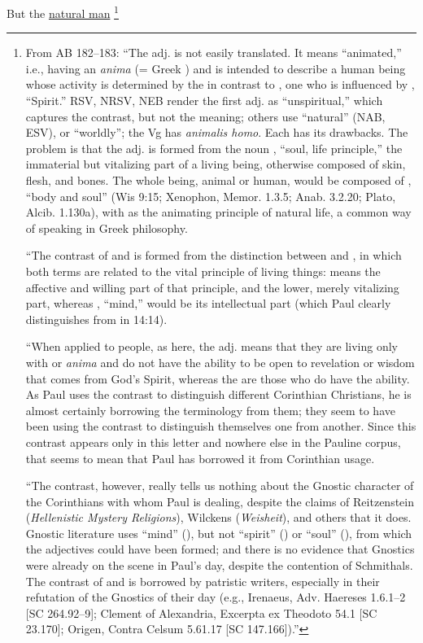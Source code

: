 			But the \hyperref[NATURAL-PHRASES]{natural man}%
				\footnote{%
					\label{1CORINTHIANS-2-14-natural}%
					From AB 182--183: ``The adj. \hyperref[PSUCHIKOS]{} is not easily translated. It means ``animated,'' i.e., having an \textit{anima} (= Greek ) and is intended to describe a human being whose activity is determined by the  in contrast to , one who is influenced by , ``Spirit.'' RSV, NRSV, NEB render the first adj. as ``unspiritual,'' which captures the contrast, but not the meaning; others use ``natural'' (NAB, ESV), or ``worldly''; the Vg has \textit{animalis homo}. Each has its drawbacks. The problem is that the adj. is formed from the noun , ``soul, life principle,'' the immaterial but vitalizing part of a living being, otherwise composed of skin, flesh, and bones. The whole being, animal or human, would be composed of , ``body and soul'' (Wis 9:15; Xenophon, Memor. 1.3.5; Anab. 3.2.20; Plato, Alcib. 1.130a), with  as the animating principle of natural life, a common way of speaking in Greek philosophy. 

					``The contrast of  and  is formed from the distinction between  and , in which both terms are related to the vital principle of living things:  means the affective and willing part of that principle, and  the lower, merely vitalizing part, whereas , ``mind,'' would be its intellectual part (which Paul clearly distinguishes from  in 14:14). 

					``When applied to people, as here, the adj.  means that they are living only with  or \textit{anima} and do not have the ability to be open to revelation or wisdom that comes from God's Spirit, whereas the  are those who do have the ability. As Paul uses the contrast to distinguish different Corinthian Christians, he is almost certainly borrowing the terminology from them; they seem to have been using the contrast to distinguish themselves one from another. Since this contrast appears only in this letter and nowhere else in the Pauline corpus, that seems to mean that Paul has borrowed it from Corinthian usage. 

					``The contrast, however, really tells us nothing about the Gnostic character of the Corinthians with whom Paul is dealing, despite the claims of Reitzenstein (\textit{Hellenistic Mystery Religions}), Wilckens (\textit{Weisheit}), and others that it does. Gnostic literature uses ``mind'' (), but not ``spirit'' () or ``soul'' (), from which the adjectives could have been formed; and there is no evidence that Gnostics were already on the scene in Paul's day, despite the contention of Schmithals. The contrast of  and  is borrowed by patristic writers, especially in their refutation of the Gnostics of their day (e.g., Irenaeus, Adv. Haereses 1.6.1--2 [SC 264.92--9]; Clement of Alexandria, Excerpta ex Theodoto 54.1 [SC 23.170]; Origen, Contra Celsum 5.61.17 [SC 147.166]).''
					
}
